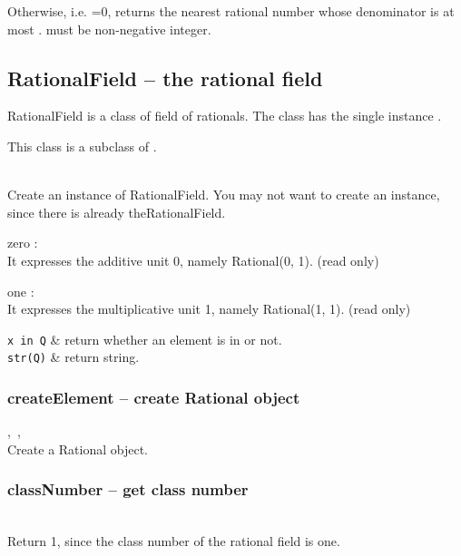    Otherwise, i.e. =0, returns the nearest rational number whose denominator is at most .
   \spacing
   \quad {} must be non-negative integer.\\
%
\C
 \subsection{RationalField -- the rational field}
RationalField is a class of field of rationals. The class has the single instance .

 This class is a subclass of .


  \initialize
  \\
  \spacing
  \quad Create an instance of RationalField. 
  You may not want to create an instance, since there is already theRationalField.
  \begin{at}
    \item[zero]:\\ It expresses the additive unit 0, namely Rational(0, 1). (read only)
    \item[one]:\\ It expresses the multiplicative unit 1, namely Rational(1, 1). (read only)
  \end{at}
  \begin{op}
    \verb|x in Q| & return whether an element is in or not.\\
    \verb|str(Q)| & return string.\\
  \end{op}
  \method
  \subsubsection{createElement -- create Rational object}
        {,\ 
          ,\ 
        }{\out{Rational}}\\
   \spacing
   \quad Create a Rational object.
%
  \subsubsection{classNumber -- get class number}
   \\
   \spacing
   \quad Return 1, since the class number of the rational field is one.
%

